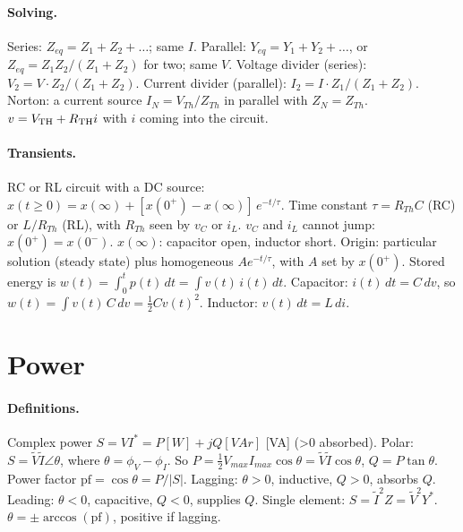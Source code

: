 \documentclass{article}
\newcommand{\abs}[1]{\lvert#1\rvert}
\begin{document}
\paragraph{Solving.}
Series: $Z_{eq} = Z_1 + Z_2 + \dots$; same $I$.
Parallel: $Y_{eq} = Y_1 + Y_2 + \dots$, or $Z_{eq} = Z_1 Z_2/(Z_1 + Z_2)$ for two; same $V$.
Voltage divider (series): $V_2 = V\cdot Z_2/(Z_1 + Z_2)$.
Current divider (parallel): $I_2 = I\cdot Z_1/(Z_1 + Z_2)$.
Norton: a current source $I_N = V_{Th}/Z_{Th}$ in parallel with $Z_N = Z_{Th}$.
$v = V_{\rm TH} + R_{\rm TH}i$ with $i$ coming into the circuit.

\paragraph{Transients.}
RC or RL circuit with a DC source: $x(t\geq 0) = x(\infty) + [x(0^+) - x(\infty)]\,e^{-t/\tau}$.
Time constant $\tau = R_{Th}C$ (RC) or $L/R_{Th}$ (RL), with $R_{Th}$ seen by $v_C$ or $i_L$.
$v_C$ and $i_L$ cannot jump: $x(0^+) = x(0^-)$.
$x(\infty)$: capacitor open, inductor short.
Origin: particular solution (steady state) plus homogeneous $Ae^{-t/\tau}$, with $A$ set by $x(0^+)$.
Stored energy is $w(t) = \int_0^t p(t)\,dt = \int v(t)\,i(t)\,dt$.
Capacitor: $i(t)\,dt = C\,dv$, so $w(t) = \int v(t)\,C\,dv = \tfrac12 C v(t)^2$.
Inductor: $v(t)\,dt = L\,di$. %



\section{Power}
\paragraph{Definitions.}
Complex power $S = VI^* = P[W] + jQ[VAr]$ [VA] (>0 absorbed).
Polar: $S = \tilde V\tilde I\angle\theta$, where $\theta = \phi_V - \phi_I$.
So $P = \tfrac12 V_{max}I_{max}\cos\theta=\tilde V\tilde I\cos\theta$, $Q = P\tan\theta$.
Power factor $\mathrm{pf} = \cos\theta = P/\abs S$.
Lagging: $\theta > 0$, inductive, $Q > 0$, absorbs $Q$.
Leading: $\theta < 0$, capacitive, $Q < 0$, supplies $Q$.
Single element: $S = \tilde I^2 Z = \tilde V^2Y^*$.
$\theta = \pm\arccos(\mathrm{pf})$, positive if lagging.
\end{document}
